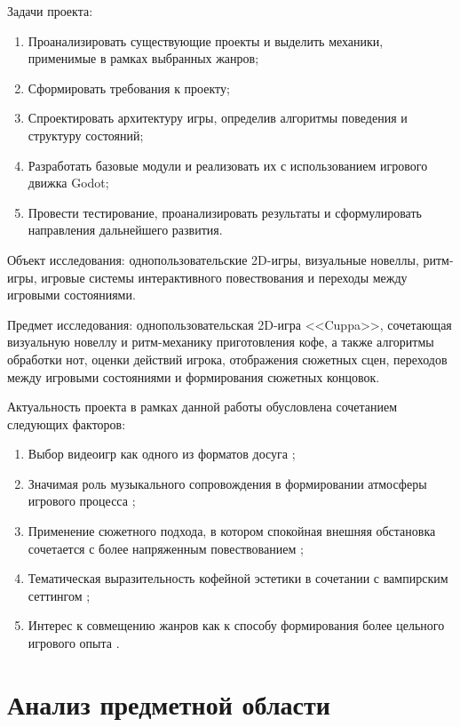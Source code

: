 \documentclass[utf8, russian]{eskdtext}
\numberwithin{equation}{section}
\let\stdsection\section
\renewcommand \section{\newpage\stdsection}
\begin{document}
Задачи проекта: 

\begin{enumerate}
    \item Проанализировать существующие проекты и выделить механики, применимые в рамках выбранных жанров;
    \item Сформировать требования к проекту;
    \item Спроектировать архитектуру игры, определив алгоритмы поведения и структуру состояний;
    \item Разработать базовые модули и реализовать их с использованием игрового движка Godot;
    \item Провести тестирование, проанализировать результаты и сформулировать направления дальнейшего развития.
\end{enumerate}

Объект исследования:  однопользовательские 2D-игры, визуальные новеллы, ритм-игры, игровые системы интерактивного повествования и переходы между игровыми состояниями.

Предмет исследования:  однопользовательская 2D-игра <<Cuppa>>, сочетающая визуальную новеллу и ритм-механику приготовления кофе, а также алгоритмы обработки нот, оценки действий игрока, отображения сюжетных сцен, переходов между игровыми состояниями и формирования сюжетных концовок.

Актуальность проекта в рамках данной работы обусловлена сочетанием следующих факторов:

\begin{enumerate}
  \item Выбор видеоигр как одного из форматов досуга \cite{esa2024};
  \item Значимая роль музыкального сопровождения в формировании атмосферы игрового процесса \cite{music2015};
  \item Применение сюжетного подхода, в котором спокойная внешняя обстановка сочетается с более напряженным повествованием \cite{narrative2022};
  \item Тематическая выразительность кофейной эстетики в сочетании с вампирским сеттингом \cite{va11steam}\cite{coffeetalksteam};
  \item Интерес к совмещению жанров как к способу формирования более цельного игрового опыта \cite{narrative2022}\cite{yunyunsteam}\cite{glisynthsteam}.
\end{enumerate}

\section{Анализ предметной области}
\end{document}
